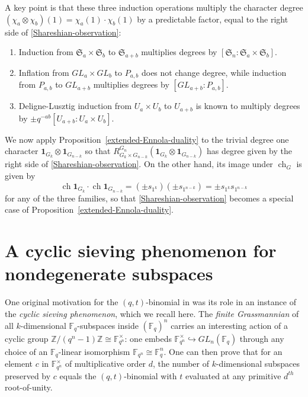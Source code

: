 \documentclass[10pt]{amsart}
\theoremstyle{plain}
\theoremstyle{definition}
\theoremstyle{remark}
\numberwithin{equation}{section}
\newcommand\triv{\mathbf{1}}
\newcommand\ch{\operatorname{ch}}
\newcommand\FF{\mathbb{F}}
\newcommand\ZZ{\mathbb{Z}}
\newcommand\symm{\mathfrak{S}}
\begin{document}
\noindent
A key point is that these three induction operations multiply
the character degree $(\chi_a \otimes \chi_b)(1)=\chi_a(1) \cdot \chi_b(1)$
by a predictable factor, equal to the right side of \eqref{Shareshian-observation}:
\begin{enumerate}  
\item[$\bullet$]
Induction from $\symm_a \times \symm_b$ to $\symm_{a+b}$ multiplies
degrees by $[\symm_n:\symm_a \times \symm_b]$.
\item[$\bullet$]
Inflation from $GL_a \times GL_b$ to $P_{a,b}$ does
not change degree, while induction from $P_{a,b}$ to $GL_{a+b}$
multiplies degrees by $[GL_{a+b}:P_{a,b}]$.
\item[$\bullet$]
Deligne-Lusztig induction from $U_a \times U_b$ to $U_{a+b}$ 
is known \cite[Proposition 12.17]{DigneMichel}
to multiply degrees by $\pm q^{-ab}[U_{a+b}:U_a \times U_b]$.
\end{enumerate}

We now apply Proposition~\ref{extended-Ennola-duality}
to the trivial degree one character 
$
\triv_{G_k} \otimes \triv_{G_{n-k}}
$
so that
$
R^{G_{n}}_{G_k \times G_{n-k}} 
\left( \triv_{G_k} \otimes \triv_{G_{n-k}} \right)
$
has degree given by the right side of \eqref{Shareshian-observation}.
On the other hand, its image under $\ch_G$ is given by 
$$
\ch \triv_{G_k} \cdot \ch \triv_{G_{n-k}}
=\left( \pm s_{1^k} \right) \left( \pm s_{1^{n-k}} \right)
=\pm s_{1^k} s_{1^{n-k}}
$$
for any of the three families, so that
\eqref{Shareshian-observation} becomes 
a special case of Proposition~\ref{extended-Ennola-duality}.










\section{A cyclic sieving phenomenon for nondegenerate subspaces}
\label{CSP-section}


One original motivation for the
$(q,t)$-binomial in \cite{RSW} was its role in an instance 
of the {\it cyclic sieving phenomenon}, which we recall here.
The {\it finite Grassmannian} of all $k$-dimensional $\FF_q$-subspaces
inside $(\FF_q)^n$ carries an interesting action of a cyclic group
$\ZZ/(q^n-1)\ZZ \cong \FF_{q^n}^\times$:  one embeds
$\FF_{q^n}^\times \hookrightarrow GL_n(\FF_q)$ through any
choice of an $\FF_q$-linear isomorphism $\FF_{q^n} \cong \FF_q^n$.
One can then prove \cite[Theorem 9.4]{RSW} that for an element 
$c$ in $\FF_{q^n}^\times$ of multiplicative
order $d$, the number of $k$-dimensional subspaces preserved by $c$ equals
the $(q,t)$-binomial with $t$ evaluated at any primitive
$d^{th}$ root-of-unity.
\end{document}
